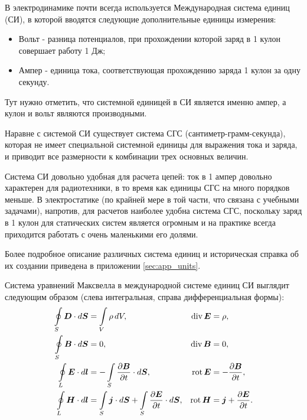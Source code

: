 В электродинамике почти всегда используется Международная система единиц (СИ), в которой вводятся следующие дополнительные единицы измерения:
\begin{itemize}
	\item Вольт - разница потенциалов, при прохождении которой заряд в 1 кулон совершает работу 1 Дж;
	\item Ампер - единица тока, соответствующая прохождению заряда 1 кулон за одну секунду. 
\end{itemize}
Тут нужно отметить, что системной единицей в СИ является именно ампер, а кулон и вольт являются производными.

Наравне с системой СИ существует система СГС (сантиметр-грамм-секунда), которая не имеет специальной системной единицы для выражения тока и заряда, и
приводит все размерности к комбинации трех основных величин.

Система СИ довольно удобная для расчета цепей: ток в 1 ампер довольно характерен для радиотехники,
в то время как единицы СГС на много порядков меньше. В электростатике (по крайней мере в той части, что связана с учебными задачами), напротив,
для расчетов наиболее удобна система СГС, поскольку заряд в 1 кулон для статических систем является огромным и на практике всегда приходится работать
с очень маленькими его долями.

Более подробное описание различных
система единиц и историческая справка об их создании приведена в приложении
\ref{sec:app_units}.

Система уравнений Максвелла в международной системе единиц СИ выглядит следующим
образом (слева интегральная, справа дифференциальная формы):
\begin{equation}
	\eqmark{maxwell-si}
	\begin{aligned}
		\oint\limits_S\vec{D}\cdot d\vec{S} &= \int\limits_V\rho\,dV,
								& \Div\vec{E} 				&= \rho,
								\\
		\oint\limits_S\vec{B}\cdot d\vec{S} &= 0,
								& \Div\vec{B}				&= 0,
								\\
		\oint\limits_L\vec{E}\cdot d\vec{l} &=
		-\int\limits_S\frac{\partial{\vec{B}}} {\partial t}\cdot d\vec{S}, 							& \Rot\vec{E} 	   			&=
-\frac{\partial\vec B}{\partial t}, \\
		\oint\limits_L\vec{H}\cdot d\vec{l} &=
		\int\limits_S\vec{j}\cdot d\vec{S} +
\int\limits_S\frac{\partial{\vec{E}}}{\partial t}\cdot d\vec{S}, 	& \Rot\vec{H}
&= \vec{j} + \frac{\partial\vec E}{\partial t}.
	\end{aligned}
\end{equation}

